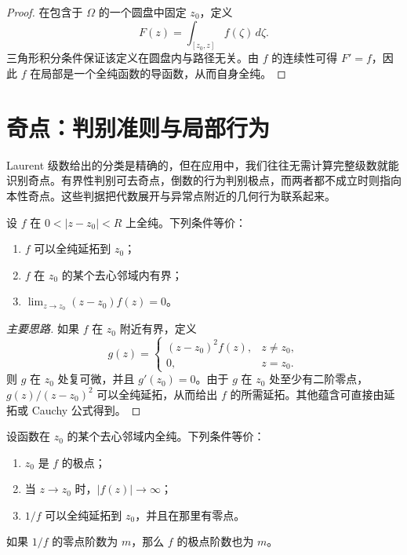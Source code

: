 \begin{proof}
在包含于 $\Omega$ 的一个圆盘中固定 $z_0$，定义
\[
    F(z)=\int_{[z_0,z]}f(\zeta)\,d\zeta.
\]
三角形积分条件保证该定义在圆盘内与路径无关。由 $f$ 的连续性可得 $F'=f$，因此 $f$ 在局部是一个全纯函数的导函数，从而自身全纯。
\end{proof}

\section{奇点：判别准则与局部行为}

Laurent 级数给出的分类是精确的，但在应用中，我们往往无需计算完整级数就能识别奇点。有界性判别可去奇点，倒数的行为判别极点，而两者都不成立时则指向本性奇点。这些判据把代数展开与异常点附近的几何行为联系起来。

\begin{theorem}
设 $f$ 在 $0<|z-z_0|<R$ 上全纯。下列条件等价：
\begin{enumerate}
    \item $f$ 可以全纯延拓到 $z_0$；
    \item $f$ 在 $z_0$ 的某个去心邻域内有界；
    \item $\displaystyle \lim_{z\to z_0}(z-z_0)f(z)=0$。
\end{enumerate}
\end{theorem}

\begin{proof}[主要思路]
如果 $f$ 在 $z_0$ 附近有界，定义
\[
    g(z)=
    \begin{cases}
    (z-z_0)^2f(z),&z\neq z_0,\\
    0,&z=z_0.
    \end{cases}
\]
则 $g$ 在 $z_0$ 处复可微，并且 $g'(z_0)=0$。由于 $g$ 在 $z_0$ 处至少有二阶零点，$g(z)/(z-z_0)^2$ 可以全纯延拓，从而给出 $f$ 的所需延拓。其他蕴含可直接由延拓或 Cauchy 公式得到。
\end{proof}

\begin{theorem}[极点的刻画]
设函数在 $z_0$ 的某个去心邻域内全纯。下列条件等价：
\begin{enumerate}
    \item $z_0$ 是 $f$ 的极点；
    \item 当 $z\to z_0$ 时，$|f(z)|\to\infty$；
    \item $1/f$ 可以全纯延拓到 $z_0$，并且在那里有零点。
\end{enumerate}
如果 $1/f$ 的零点阶数为 $m$，那么 $f$ 的极点阶数也为 $m$。
\end{theorem}

